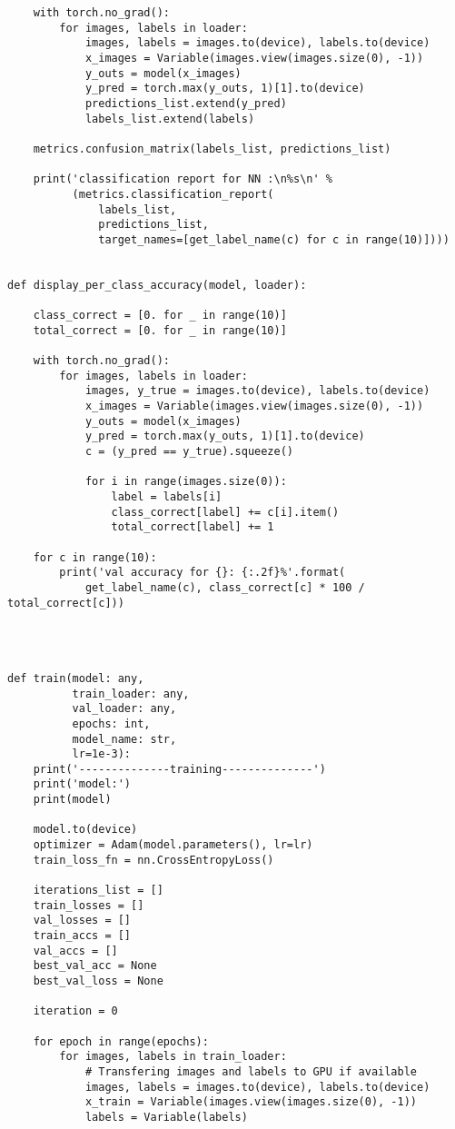 \begin{verbatim}
    with torch.no_grad():
        for images, labels in loader:
            images, labels = images.to(device), labels.to(device)
            x_images = Variable(images.view(images.size(0), -1))
            y_outs = model(x_images)
            y_pred = torch.max(y_outs, 1)[1].to(device)
            predictions_list.extend(y_pred)
            labels_list.extend(labels)

    metrics.confusion_matrix(labels_list, predictions_list)

    print('classification report for NN :\n%s\n' %
          (metrics.classification_report(
              labels_list,
              predictions_list,
              target_names=[get_label_name(c) for c in range(10)])))


def display_per_class_accuracy(model, loader):

    class_correct = [0. for _ in range(10)]
    total_correct = [0. for _ in range(10)]

    with torch.no_grad():
        for images, labels in loader:
            images, y_true = images.to(device), labels.to(device)
            x_images = Variable(images.view(images.size(0), -1))
            y_outs = model(x_images)
            y_pred = torch.max(y_outs, 1)[1].to(device)
            c = (y_pred == y_true).squeeze()

            for i in range(images.size(0)):
                label = labels[i]
                class_correct[label] += c[i].item()
                total_correct[label] += 1

    for c in range(10):
        print('val accuracy for {}: {:.2f}%'.format(
            get_label_name(c), class_correct[c] * 100 / total_correct[c]))




def train(model: any,
          train_loader: any,
          val_loader: any,
          epochs: int,
          model_name: str,
          lr=1e-3):
    print('--------------training--------------')
    print('model:')
    print(model)

    model.to(device)
    optimizer = Adam(model.parameters(), lr=lr)
    train_loss_fn = nn.CrossEntropyLoss()

    iterations_list = []
    train_losses = []
    val_losses = []
    train_accs = []
    val_accs = []
    best_val_acc = None
    best_val_loss = None

    iteration = 0

    for epoch in range(epochs):
        for images, labels in train_loader:
            # Transfering images and labels to GPU if available
            images, labels = images.to(device), labels.to(device)
            x_train = Variable(images.view(images.size(0), -1))
            labels = Variable(labels)


\end{verbatim}
